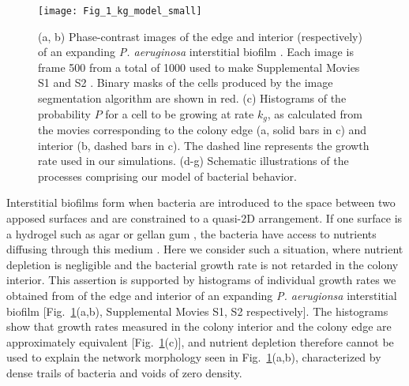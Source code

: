 \documentclass[aps,prl,numerical,reprint,superscriptaddress,showpacs]{revtex4-1}
\begin{document}
 

\begin{figure}
\centering
{\texttt{[image: Fig\_1\_kg\_model\_small]}}
\caption{(a, b) Phase-contrast images of the edge and interior (respectively) of an expanding {\it P. aeruginosa} interstitial biofilm \cite{gloag2013self}. Each image is frame 500 from a total of 1000 used to make Supplemental Movies S1 and S2 \cite{Supp}. Binary masks of the cells produced by the image segmentation algorithm are shown in red. (c) Histograms of the probability $P$ for a cell to be growing at rate $k_g$, as calculated from the movies corresponding to the colony edge (a, solid bars in c) and interior (b, dashed bars in c). The dashed line represents the growth rate used in our simulations. (d-g) Schematic illustrations of the processes comprising our model of bacterial behavior.}
\label{Fig1}
\end{figure}




Interstitial biofilms form when bacteria are introduced to the space between two apposed surfaces and are constrained to a quasi-2D arrangement. If one surface is a hydrogel such as agar or gellan gum \cite{gloag2013self,semmler1999re}, the bacteria have access to nutrients diffusing through this medium \cite{schantz1962diffusion}. Here we consider such a situation, where nutrient depletion is negligible and the bacterial growth rate is not retarded in the colony interior. This assertion is supported by histograms of individual growth rates we obtained from of the edge and interior  of an expanding {\it P. aerugionsa} interstitial biofilm [Fig.~\ref{Fig1}(a,b), Supplemental Movies S1, S2 \cite{Supp} respectively]. The histograms show that growth rates measured in the colony interior and the colony edge are approximately equivalent [Fig.~\ref{Fig1}(c)], and nutrient depletion therefore cannot be used to explain the network morphology seen in Fig.~\ref{Fig1}(a,b), characterized by dense trails of bacteria and voids of zero density. 
\end{document}
